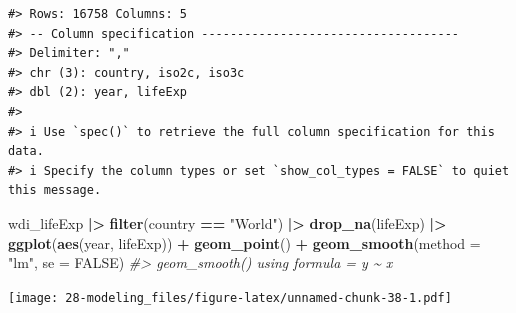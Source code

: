 \documentclass[
  xelatex, ja=standard]{bxjsbook}
\newenvironment{Shaded}{\begin{snugshade}}{\end{snugshade}}
\newcommand{\AttributeTok}[1]{\textcolor[rgb]{0.13,0.29,0.53}{#1}}
\newcommand{\CommentTok}[1]{\textcolor[rgb]{0.56,0.35,0.01}{\textit{#1}}}
\newcommand{\ConstantTok}[1]{\textcolor[rgb]{0.56,0.35,0.01}{#1}}
\newcommand{\FunctionTok}[1]{\textcolor[rgb]{0.13,0.29,0.53}{\textbf{#1}}}
\newcommand{\NormalTok}[1]{#1}
\newcommand{\SpecialCharTok}[1]{\textcolor[rgb]{0.81,0.36,0.00}{\textbf{#1}}}
\newcommand{\StringTok}[1]{\textcolor[rgb]{0.31,0.60,0.02}{#1}}
\theoremstyle{definition}
\theoremstyle{definition}
\theoremstyle{definition}
\theoremstyle{definition}
\theoremstyle{remark}
\begin{document}
\begin{verbatim}
#> Rows: 16758 Columns: 5
#> -- Column specification ------------------------------------
#> Delimiter: ","
#> chr (3): country, iso2c, iso3c
#> dbl (2): year, lifeExp
#> 
#> i Use `spec()` to retrieve the full column specification for this data.
#> i Specify the column types or set `show_col_types = FALSE` to quiet this message.
\end{verbatim}

\begin{Shaded}
\begin{Highlighting}[]
\NormalTok{wdi\_lifeExp }\SpecialCharTok{|\textgreater{}} \FunctionTok{filter}\NormalTok{(country }\SpecialCharTok{==} \StringTok{"World"}\NormalTok{) }\SpecialCharTok{|\textgreater{}} \FunctionTok{drop\_na}\NormalTok{(lifeExp) }\SpecialCharTok{|\textgreater{}}
  \FunctionTok{ggplot}\NormalTok{(}\FunctionTok{aes}\NormalTok{(year, lifeExp)) }\SpecialCharTok{+} \FunctionTok{geom\_point}\NormalTok{() }\SpecialCharTok{+} \FunctionTok{geom\_smooth}\NormalTok{(}\AttributeTok{method =} \StringTok{"lm"}\NormalTok{, }\AttributeTok{se =} \ConstantTok{FALSE}\NormalTok{)}
\CommentTok{\#\textgreater{} \textasciigrave{}geom\_smooth()\textasciigrave{} using formula = \textquotesingle{}y \textasciitilde{} x\textquotesingle{}}
\end{Highlighting}
\end{Shaded}

\texttt{[image: 28-modeling\_files/figure-latex/unnamed-chunk-38-1.pdf]}
\end{document}
